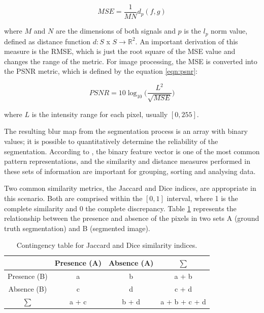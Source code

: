 \begin{equation}
\label{eqn:mse_lp_norm}
	MSE =  \frac{1}{MN}d_p(f,g)
\end{equation}

\noindent where $M$ and $N$ are the dimensions of both signals and $p$ is the $l_{p}$ norm value, defined as distance function $d:S$ x $S \rightarrow \mathbb{R}^2$. An important derivation of this measure is the RMSE, which is just the root square of the MSE value and changes the range of the metric. For image processing, the MSE is converted into the PSNR metric, which is defined by the equation \ref{eqn:psnr}:

\begin{equation}
\label{eqn:psnr}
	PSNR = 10\log_{10}\Bigg(\frac{L^2}{\sqrt{MSE}}\Bigg)
\end{equation}

\noindent where $L$ is the intensity range for each pixel, usually $[0,255]$.

The resulting blur map from the segmentation process is an array with binary values; it is possible to quantitatively determine the reliability of the segmentation. According to , the binary feature vector is one of the most common pattern representations, and the similarity and distance measures performed in these sets of information are important for grouping, sorting and analysing data.

Two common similarity metrics, the Jaccard and Dice indices, are appropriate in this scenario. Both are comprised within the $[0,1]$ interval, where 1 is the complete similarity and 0 the complete discrepancy. Table \ref{tab:jaccard_contingency} represents the relationship between the presence and absence of the pixels in two sets A (ground truth segmentation) and B (segmented image).

        \begin{table}[!hbt]
		\begin{center}
		\caption{Contingency table for Jaccard and Dice similarity indices.}
		\label{tab:jaccard_contingency}
		\begin{tabular}{|c|c|c|c|}
            \hline
             & Presence (A) & Absence (A) & $\mathit{\sum}$\\
    		\hline
          	 Presence (B) & a & b & a + b\\
    		\hline
          	 Absence (B) & c & d & c + d\\
			\hline
             $\mathit{\sum}$ & a + c & b + d & a + b + c + d\\
            \hline
		\end{tabular}
		\end{center}
		\fautor
      \end{table}
      
